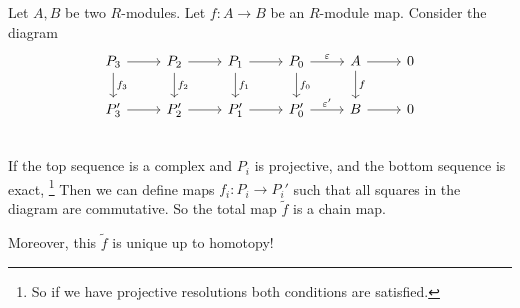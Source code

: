 \begin{theorem}
    Let $A, B$ be two $R$-modules. Let $f: A \to  B$ be an $R$-module map.
    Consider the diagram
    \[
        \begin{tikzcd}
            P_3 \arrow[r, ""] \arrow[d, "f_3"]& 
            P_2 \arrow[r, ""] \arrow[d, "f_2"]& 
            P_1 \arrow[r, ""] \arrow[d, "f_1"]& 
            P_0 \arrow[r, "\epsilon"] \arrow[d, "f_0"]& 
            A \arrow[r, ""] \arrow[d, "f"]& 
            0\\
            P_3' \arrow[r, ""] & 
            P_2' \arrow[r, ""] & 
            P_1' \arrow[r, ""] & 
            P_0' \arrow[r, "\epsilon'"] & 
            B \arrow[r, ""] & 
            0\\
        \end{tikzcd}
    \]
    If the top sequence is a complex and $P_i$ is projective, and the bottom sequence is exact, \footnote{So if we have projective resolutions both conditions are satisfied.}
    Then we can define maps $f_i: P_i \to  P_i'$ such that all squares in the diagram are commutative.
    So the total map $\tilde{f}$ is a chain map.

    Moreover, this $ \tilde{f}$ is unique up to homotopy!
\end{theorem}
